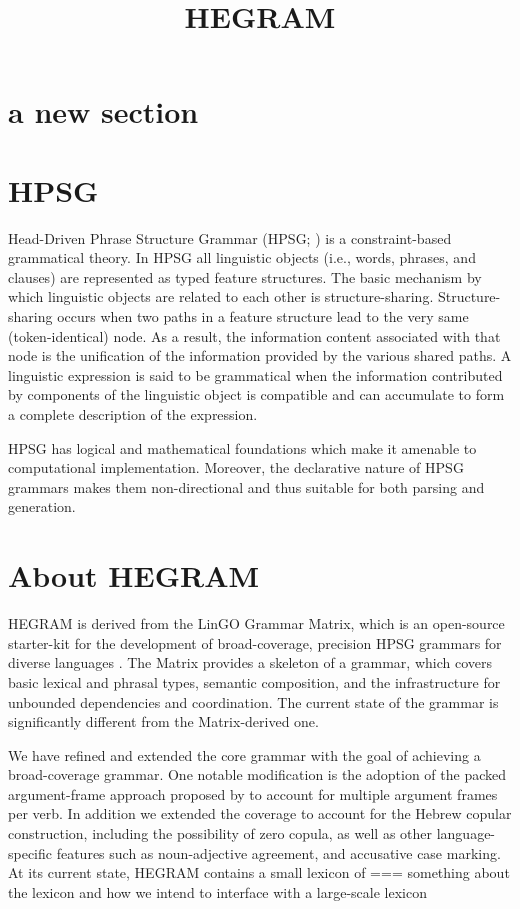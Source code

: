 \documentclass[a4paper]{article}
\title{HEGRAM}
\begin{document}
\section{a new section}

\section{HPSG}
Head-Driven Phrase Structure Grammar (HPSG; \citealt{PollardSag94}) is  a constraint-based
grammatical theory. In HPSG all linguistic objects (i.e., words, phrases, and clauses) are represented as typed feature structures.
The basic mechanism by which linguistic objects are related to each
other is structure-sharing. Structure-sharing occurs when two paths in a
feature structure lead to the very same (token-identical) node. As a result,
the information content associated with that node is the unification of the
information provided by the various shared paths. A linguistic expression
is said to be grammatical when the information contributed by components
of the linguistic object is compatible and can accumulate to form
a complete description of the expression.

HPSG has logical and mathematical foundations which make it
amenable to computational implementation. Moreover, the declarative nature of HPSG grammars makes them non-directional and thus suitable for both parsing and generation.

\section{About HEGRAM}

HEGRAM is derived from the LinGO Grammar Matrix, which is an open-source starter-kit for the development of broad-coverage, precision HPSG grammars for diverse languages \citep{BenderFlickingerOepen02}. The Matrix provides a skeleton of a grammar, which covers basic lexical and phrasal types, semantic composition, and the infrastructure for unbounded dependencies and coordination. The current state of the grammar is significantly different from the Matrix-derived one.

We have refined and extended the core grammar with the goal of achieving a broad-coverage grammar. One notable modification is the adoption of the packed argument-frame approach proposed by \citet{Haugereid11} to account for multiple argument frames per verb. In addition we extended the coverage to account for the Hebrew copular construction, including the possibility of zero copula, as well as other language-specific features such as noun-adjective agreement, and accusative case marking. At its current state, HEGRAM contains a small lexicon of
=== something about the lexicon and how we intend to interface with a large-scale lexicon
\end{document}
